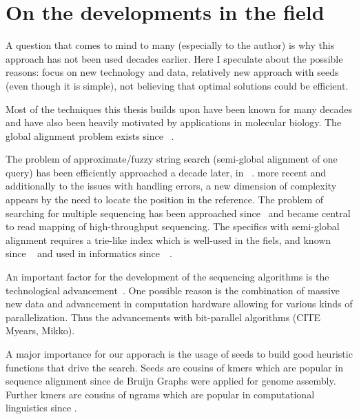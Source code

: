 \section{On the developments in the field}

A question that comes to mind to many (especially to the author) is why this
approach has not been used decades earlier. Here I speculate about the possible
reasons: focus on new technology and data, relatively new approach with seeds
(even though it is simple), not believing that optimal solutions could be
efficient.

Most of the techniques this thesis builds upon have been known for many decades
and have also been heavily motivated by applications in molecular biology. The
global alignment problem exists since
\citeyear{vintsyuk1968speech}~\cite{vintsyuk1968speech,needleman1970general}.

The problem of approximate/fuzzy string search (semi-global alignment of one
query) has been efficiently approached a decade later, in
\citeyear{sellers1980theory}~\cite{sellers1980theory,smith1981identification}.
more recent and additionally to the issues with handling errors, a new dimension
of complexity appears by the need to locate the position in the reference. The
problem of searching for multiple sequencing has been approached
since\citeyear{pearson1988improved}~\cite{pearson1988improved} and became
central to read mapping of high-throughput sequencing. The specifics with
semi-global alignment requires a trie-like index which is well-used in the
fiels, and known since
\citeyear{thue1912gegenseitige}~\cite{thue1912gegenseitige} and used in
informatics since~\citeyear{de1959file}~\cite{de1959file}.

An important factor for the development of the sequencing algorithms is the
technological advancement~\cite{alser2021technology}. One possible reason is the
combination of massive new data and advancement in computation hardware allowing
for various kinds of parallelization. Thus the advancements with bit-parallel
algorithms (CITE Myears, Mikko).

A major importance for our apporach is the usage of seeds to build good
heuristic functions that drive the \A search. Seeds are cousins of kmers which
are popular in sequence alignment since de Bruijn Graphs were applied for genome
assembly. Further kmers are cousins of ngrams which are popular in computational
linguistics since .

